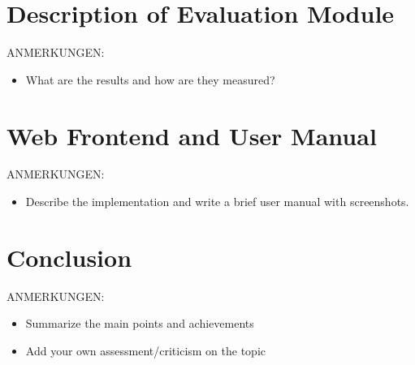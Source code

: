 \documentclass[12pt]%
{article}
\begin{document}
\section{Description of Evaluation Module}
ANMERKUNGEN:
\begin{itemize}
\item What are the results and how are they measured?
\end{itemize}

\section{Web Frontend and User Manual}
ANMERKUNGEN:
\begin{itemize}
\item Describe the implementation and write a brief user manual with screenshots.
\end{itemize}

\section{Conclusion}
ANMERKUNGEN:
\begin{itemize}
\item Summarize the main points and achievements
\item Add your own assessment/criticism on the topic
\end{itemize}

\newpage

\printglossary[style=altlist,title=Glossary]
 
\printglossary[type=\acronymtype,style=long]
 
\printglossary[type=symbolslist,style=long]

\newpage



\end{document}
